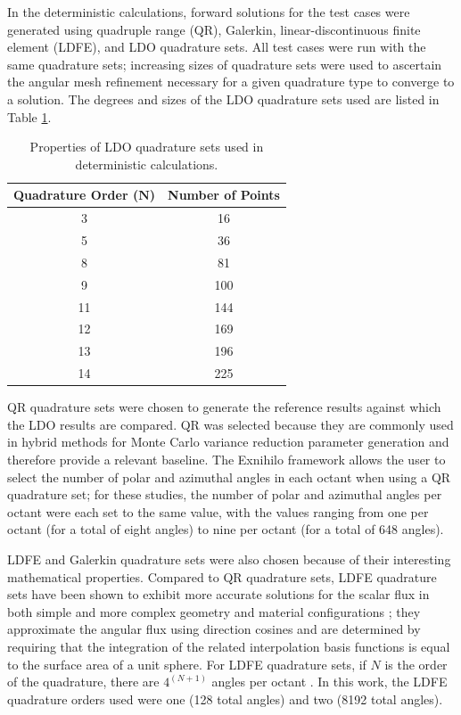 \documentclass{article} %
\begin{document}
In the deterministic calculations, forward solutions for the test cases were
generated using quadruple range (QR), Galerkin, linear-discontinuous finite 
element (LDFE), and LDO quadrature sets. All test cases were run with the same 
quadrature sets; increasing sizes of quadrature sets were used to ascertain the
angular mesh refinement necessary for a given quadrature type to converge to a 
solution. The degrees and sizes of the LDO quadrature sets used are listed in
Table \ref{ldo-n}.

\begin{table}[!htb]
\centering
\caption{Properties of LDO quadrature sets used in deterministic calculations.}
\begin{tabular}{cc}
\multicolumn{1}{l}{\textbf{Quadrature Order ($\mathbf{N}$)}} & 
\multicolumn{1}{l}{\textbf{Number of Points}} \\
\hline
3 & 16 \\
5 & 36 \\
8 & 81 \\
9 & 100 \\
11 & 144 \\
12 & 169 \\
13 & 196 \\
14 & 225 \\
\end{tabular}
\label{ldo-n}
\end{table}

QR quadrature sets were chosen to generate the reference results against which
the LDO results are compared. QR was selected because they are commonly used 
in hybrid methods for Monte Carlo variance reduction parameter generation and 
therefore provide a relevant baseline. The Exnihilo framework allows the user
to select the number of polar and azimuthal angles in each octant when using a
QR quadrature set; for these studies, the number of polar and azimuthal angles
per octant were each set to the same value, with the values ranging from one
per octant (for a total of eight angles) to nine per octant (for a total of
648 angles). 

LDFE and Galerkin quadrature sets were also chosen because of their interesting
mathematical properties. Compared to QR quadrature sets, LDFE quadrature sets
have been shown to exhibit more accurate solutions for the scalar flux in both 
simple and more complex geometry and material configurations \cite{ldfe}; they 
approximate the angular flux using direction cosines and are determined by
requiring that the integration of the related interpolation basis functions is
equal to the surface area of a unit sphere. For LDFE quadrature sets, if $N$ is
the order of the quadrature, there are $4^{(N+1)}$ angles per octant
\cite{exum}. In this work, the LDFE quadrature orders used were one (128 total
angles) and two (8192 total angles).
\end{document}
